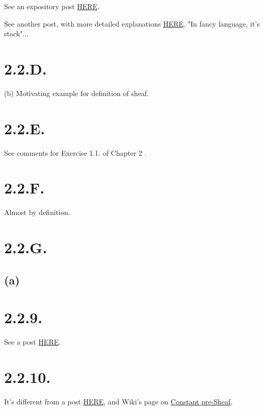 See an expository post \href{https://math.stackexchange.com/questions/4156317/sheaf-axioms-and-limits-intuition}{HERE}.

See another post, with more detailed explanations \href{https://math.stackexchange.com/questions/455706/gluing-sheaves-can-we-realize-mathcalfw-as-some-kind-of-limit}{HERE}. "In fancy language, it's stack"...

\section{2.2.D.}\label{2.2.D.}

(b) Motivating example for definition of sheaf.

\section{2.2.E.}

See comments for Exercise 1.1. of Chapter 2 \cite{hartshorne2013algebraic}.

\section{2.2.F.}

Almost by definition.

\section{2.2.G.}

\subsection{(a)}



\section{2.2.9.}

See a post \href{https://math.stackexchange.com/questions/385591/question-on-sheafification-of-a-presheaf}{HERE}.

\section{2.2.10.}
It's different from a post \href{https://math.stackexchange.com/questions/195363/constant-presheaf-not-necessarily-a-sheaf-proof}{HERE}, and Wiki's page on \href{https://en.wikipedia.org/wiki/Constant_sheaf}{Constant pre-Sheaf}. \\\\


